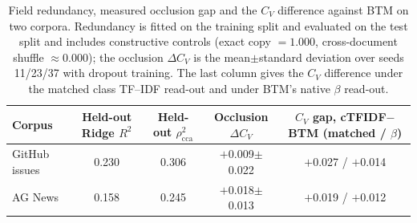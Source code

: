 \documentclass[11pt]{article}
\begin{document}
\begin{table}[t]
\centering
\caption{Field redundancy, measured occlusion gap and the $C_V$ difference against BTM on two corpora. Redundancy is fitted on the training split and evaluated on the test split and includes constructive controls (exact copy $=1.000$, cross-document shuffle $\approx0.000$); the occlusion $\Delta C_V$ is the mean$\pm$standard deviation over seeds 11/23/37 with dropout training. The last column gives the $C_V$ difference under the matched class TF--IDF read-out and under BTM's native $\beta$ read-out.}
\label{tab:conditional}
\footnotesize
\setlength{\tabcolsep}{4pt}
\begin{tabular}{@{}lcccc@{}}
\toprule
Corpus & Held-out Ridge $R^2$ & Held-out $\rho^2_{\mathrm{cca}}$
 & Occlusion $\Delta C_V$ & $C_V$ gap, cTFIDF$-$BTM (matched / $\beta$) \\
\midrule
GitHub issues & 0.230 & 0.306 & $+$0.009$\pm$0.022 & $+$0.027 / $+$0.014 \\
AG News & 0.158 & 0.245 & $+$0.018$\pm$0.013 & $+$0.019 / $+$0.012 \\
\bottomrule
\end{tabular}
\end{table}
\end{document}
